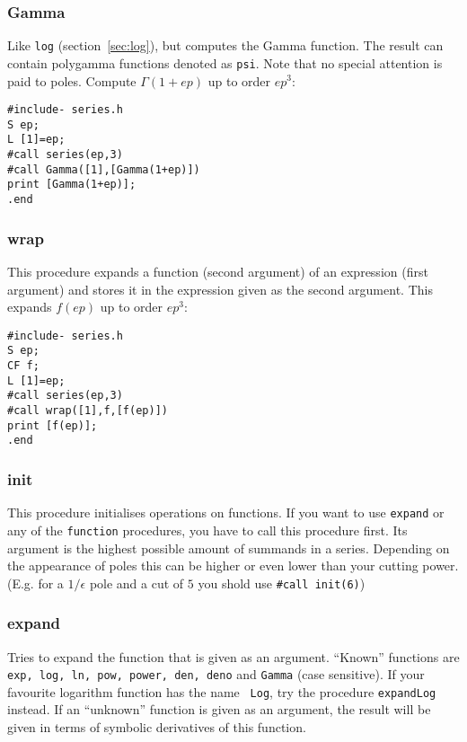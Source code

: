 \documentclass{article}
\begin{document}
\subsubsection{Gamma}
\label{sec:gamma}

Like {\tt log} (section~\ref{sec:log}), but computes the
Gamma function. The result can contain polygamma functions denoted as
{\tt psi}. Note that no special attention is paid to poles.
Compute $\Gamma(1+ep)$ up to order $ep^3$:
\begin{verbatim}
#include- series.h
S ep;
L [1]=ep;
#call series(ep,3)
#call Gamma([1],[Gamma(1+ep)])
print [Gamma(1+ep)];
.end
\end{verbatim} 


\subsubsection{wrap}
\label{sec:wrap}

This procedure expands a function (second argument) of an expression
(first argument)
and stores it in the expression given as the second argument.
This expands $f(ep)$ up to order $ep^3$:
\begin{verbatim}
#include- series.h
S ep;
CF f;
L [1]=ep;
#call series(ep,3)
#call wrap([1],f,[f(ep)])
print [f(ep)];
.end
\end{verbatim}

\subsubsection{init}
\label{sec:invert}

This procedure initialises operations on functions. If you want to use
{\tt expand} or any of the {\tt *function} procedures, you have to call
this procedure first. Its argument is the highest possible amount of
summands in a series. Depending on the appearance of poles this can be
higher or even lower than your cutting power. (E.g. for a $1/\epsilon$
pole and a cut of $5$ you shold use {\tt \#call init(6)})

\subsubsection{expand}
\label{sec:expand}

Tries to expand the function that is given as an argument. ``Known''
functions are {\tt exp, log, ln, pow, power, den, deno} and {\tt Gamma}
(case sensitive). If your favourite logarithm function has the name {\tt
Log}, try the procedure {\tt expandLog} instead. If an ``unknown''
function is given as an argument, the result will be given in terms of
symbolic derivatives of this function.
\end{document}
